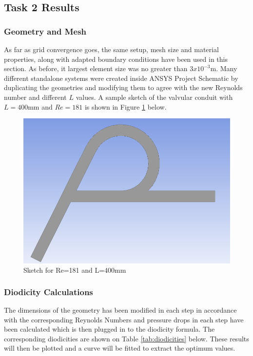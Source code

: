 \subsection{Task 2 Results}
\label{sec:task2results}
\subsubsection{Geometry and Mesh}
As far as grid convergence goes, the same setup, mesh size and material properties, along with adapted boundary conditions have been used in this section. As before, it largest element size was no greater than $3x10^{-3}$m. Many different standalone systems were created inside ANSYS Project Schematic by duplicating the geometries and modifying them to agree with the new Reynolds number and different $L$ values. A sample sketch of the valvular conduit with $L=400$mm and $Re=181$ is shown in Figure \ref{fig:examplesketch} below.\\

\begin{figure}[H]
    \centering
    \includegraphics[width = .8\textwidth]{images/task2/sketch_examples/re181.png}
    \caption{Sketch for Re=181 and L=400mm}
    \label{fig:examplesketch}
\end{figure}

\subsubsection{Diodicity Calculations}
The dimensions of the geometry has been modified in each step in accordance with the corresponding Reynolds Numbers and pressure drops in each step have been calculated which is then plugged in to the diodicity formula. The corresponding diodicities are shown on Table \ref{tab:diodicities} below. These results will then be plotted and a curve will be fitted to extract the optimum values.




